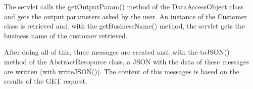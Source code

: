The servlet calls the getOutputParam() method of the DataAccessObject class and gets the output parameters asked by the user. An instance of the Customer class is retrieved and, with the getBusinessName() method, the servlet gets the business name of the customer retrieved.

After doing all of this, three messages are created and, with the toJSON() method of the AbstractResopurce class, a JSON with the data of these messages are written (with writeJSON()). The content of this messages is based on the results of the GET request.